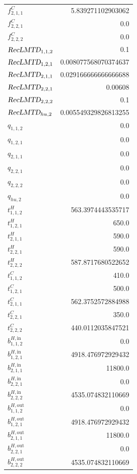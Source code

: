 \documentclass{article}%
\begin{document}
\begin{multicols*}{3}
\begin{supertabular}{lr}
	$f_{2,1,1}^{C}$ & 5.839271102903062 \\%
	$f_{2,2,1}^{C}$ & 0.0 \\%
	$f_{2,2,2}^{C}$ & 0.0 \\%
	$\textsl{RecLMTD}_{1,1,2}$ & 0.1 \\%
	$\textsl{RecLMTD}_{1,2,1}$ & 0.008077568070374637 \\%
	$\textsl{RecLMTD}_{2,1,1}$ & 0.029166666666666688 \\%
	$\textsl{RecLMTD}_{2,2,1}$ & 0.00608 \\%
	$\textsl{RecLMTD}_{2,2,2}$ & 0.1 \\%
	$\textsl{RecLMTD}_{hu,2}$ & 0.005549329826813255 \\%
	$q_{1,1,2}$ & 0.0 \\%
	$q_{1,2,1}$ & 0.0 \\%
	$q_{2,1,1}$ & 0.0 \\%
	$q_{2,2,1}$ & 0.0 \\%
	$q_{2,2,2}$ & 0.0 \\%
	$q_{hu,2}$ & 0.0 \\%
	$t_{1,1,2}^{H}$ & 563.3974443535717 \\%
	$t_{1,2,1}^{H}$ & 650.0 \\%
	$t_{2,1,1}^{H}$ & 590.0 \\%
	$t_{2,2,1}^{H}$ & 590.0 \\%
	$t_{2,2,2}^{H}$ & 587.8717680522652 \\%
	$t_{1,1,2}^{C}$ & 410.0 \\%
	$t_{1,2,1}^{C}$ & 500.0 \\%
	$t_{2,1,1}^{C}$ & 562.3752572884988 \\%
	$t_{2,2,1}^{C}$ & 350.0 \\%
	$t_{2,2,2}^{C}$ & 440.0112035847521 \\%
	$b_{1,1,2}^{H,\text{in}}$ & 0.0 \\%
	$b_{1,2,1}^{H,\text{in}}$ & 4918.476972929432 \\%
	$b_{2,1,1}^{H,\text{in}}$ & 11800.0 \\%
	$b_{2,2,1}^{H,\text{in}}$ & 0.0 \\%
	$b_{2,2,2}^{H,\text{in}}$ & 4535.074832110669 \\%
	$b_{1,1,2}^{H,\text{out}}$ & 0.0 \\%
	$b_{1,2,1}^{H,\text{out}}$ & 4918.476972929432 \\%
	$b_{2,1,1}^{H,\text{out}}$ & 11800.0 \\%
	$b_{2,2,1}^{H,\text{out}}$ & 0.0 \\%
	$b_{2,2,2}^{H,\text{out}}$ & 4535.074832110669 \\%

\end{supertabular}
\end{multicols*}
\end{document}
